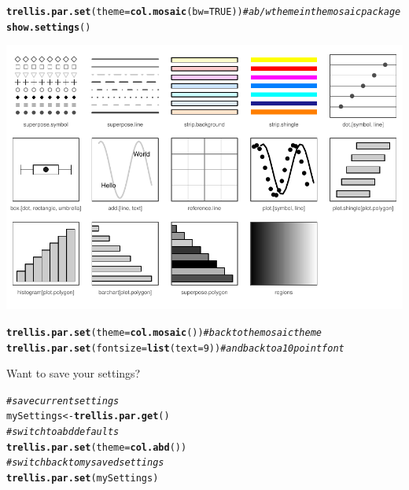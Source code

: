 \documentclass[twoside]{book}\usepackage[]{graphicx}\usepackage[]{xcolor}
\makeatletter
\def\maxwidth{ %
  \ifdim\Gin@nat@width>\linewidth
    \linewidth
  \else
    \Gin@nat@width
  \fi
}
\newcommand{\hlnum}[1]{\textcolor[rgb]{0.686,0.059,0.569}{#1}}%
\newcommand{\hlcom}[1]{\textcolor[rgb]{0.678,0.584,0.686}{\textit{#1}}}%
\newcommand{\hlstd}[1]{\textcolor[rgb]{0.345,0.345,0.345}{#1}}%
\newcommand{\hlkwb}[1]{\textcolor[rgb]{0.69,0.353,0.396}{#1}}%
\newcommand{\hlkwc}[1]{\textcolor[rgb]{0.333,0.667,0.333}{#1}}%
\newcommand{\hlkwd}[1]{\textcolor[rgb]{0.737,0.353,0.396}{\textbf{#1}}}%
\newenvironment{kframe}{%
 \def\at@end@of@kframe{}%
 \ifinner\ifhmode%
  \def\at@end@of@kframe{\end{minipage}}%
  \begin{minipage}{\columnwidth}%
 \fi\fi%
 \def\FrameCommand##1{\hskip\@totalleftmargin \hskip-\fboxsep
 \colorbox{shadecolor}{##1}\hskip-\fboxsep
     \hskip-\linewidth \hskip-\@totalleftmargin \hskip\columnwidth}%
 \MakeFramed {\advance\hsize-\width
   \@totalleftmargin\z@ \linewidth\hsize
   \@setminipage}}%
 {\par\unskip\endMakeFramed%
 \at@end@of@kframe}
\newenvironment{knitrout}{}{} %
\makeatother
\begin{document}
\begin{knitrout}
\color{fgcolor}\begin{kframe}
\begin{alltt}
\hlkwd{trellis.par.set}\hlstd{(}\hlkwc{theme} \hlstd{=} \hlkwd{col.mosaic}\hlstd{(}\hlkwc{bw} \hlstd{=} \hlnum{TRUE}\hlstd{))}  \hlcom{# a b/w theme in the mosaic package}
\hlkwd{show.settings}\hlstd{()}
\end{alltt}
\end{kframe}

{\centering \includegraphics[width=\maxwidth,height=.4\textheight]{figures/fig-themes-mosaicbw-1} 

}



\end{knitrout}

\begin{knitrout}
\color{fgcolor}\begin{kframe}
\begin{alltt}
\hlkwd{trellis.par.set}\hlstd{(}\hlkwc{theme} \hlstd{=} \hlkwd{col.mosaic}\hlstd{())}  \hlcom{# back to the mosaic theme}
\hlkwd{trellis.par.set}\hlstd{(}\hlkwc{fontsize} \hlstd{=} \hlkwd{list}\hlstd{(}\hlkwc{text} \hlstd{=} \hlnum{9}\hlstd{))}  \hlcom{# and back to a 10 point font}
\end{alltt}
\end{kframe}
\end{knitrout}

Want to save your settings?
\begin{knitrout}
\color{fgcolor}\begin{kframe}
\begin{alltt}
\hlcom{# save current settings}
\hlstd{mySettings} \hlkwb{<-} \hlkwd{trellis.par.get}\hlstd{()}
\hlcom{# switch to abd defaults}
\hlkwd{trellis.par.set}\hlstd{(}\hlkwc{theme} \hlstd{=} \hlkwd{col.abd}\hlstd{())}
\hlcom{# switch back to my saved settings}
\hlkwd{trellis.par.set}\hlstd{(mySettings)}
\end{alltt}
\end{kframe}
\end{knitrout}
\end{document}
